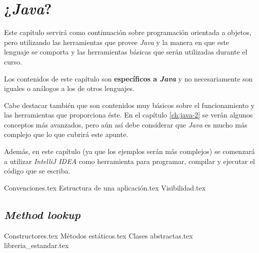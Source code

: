 \chapter{¿\textit{Java}?}
  \label{ch:java}
  Este capítulo servirá como continuación sobre programación orientada a objetos, pero 
  utilizando las herramientas que provee \textit{Java} y la manera en que este lenguaje se
  comporta y las herramientas básicas que serán utilizadas durante el curso.

  Los contenidos de este capítulo son \textbf{específicos a \textit{Java}} y no 
  necesariamente son iguales o análogos a los de otros lenguajes.

  Cabe destacar también que son contenidos muy básicos sobre el funcionamiento y las 
  herramientas que proporciona éste.
  En el capítulo \ref{ch:java-2} se verán algunos conceptos más avanzados, pero aún así
  debe considerar que \textit{Java} es mucho más complejo que lo que cubrirá este apunte.

  Además, en este capítulo (ya que los ejemplos serán más complejos) se comenzará a 
  utilizar \textit{IntelliJ IDEA} como herramienta para programar, compilar y ejecutar 
  el código que se escriba.

  {Convenciones.tex}
  {Estructura de una aplicación.tex}
  {Visibilidad.tex}
  \section{\textit{Method lookup}}
    \label{sec:lookup}
  {Constructores.tex}
  {Métodos estáticos.tex}
  {Clases abstractas.tex}
  {libreria_estandar.tex}

  \nocite{*}
  \printbibliography[keyword=java-2]
%